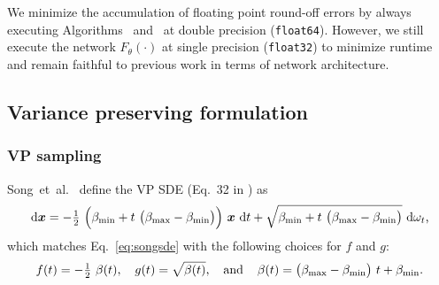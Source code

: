 We minimize the accumulation of floating point round-off errors by always executing Algorithms~ and~ at double precision (\texttt{float64}).
However, we still execute the network $F_\theta(\cdot)$ at single precision (\texttt{float32}) to minimize runtime and remain faithful to previous work in terms of network architecture.

\subsection{Variance preserving formulation}
\label{app:reframingvp}

\subsubsection{VP sampling}

Song~et~al.~\cite{Song2021sde} define the VP SDE (Eq.~32 in \cite{Song2021sde}) as
\begin{equation}
  \mathrm{d}\boldsymbol{x} = -\tfrac{1}{2} ~\Big( \beta_\text{min} + t ~\big( \beta_\text{max} - \beta_\text{min} \big) \Big) ~\boldsymbol{x} ~\mathrm{d} t + \sqrt{ \beta_\text{min} + t ~\big( \beta_\text{max} - \beta_\text{min} \big) } ~\mathrm{d} \omega_t
  \text{,}
\end{equation}
which matches Eq.~\ref{eq:songsde} with the following choices for $f$ and $g$:
\begin{equation}
  \label{eq:vpfg}
  f(t) = -\tfrac{1}{2} ~\beta(t)
  \text{,}\hspace{4mm}
  g(t) = \sqrt{\beta(t)}
  \text{,}\hspace{4mm}\text{and}\hspace{4mm}
  \beta(t) = \big( \beta_\text{max} - \beta_\text{min} \big) ~t + \beta_\text{min}
  \text{.}
\end{equation}


